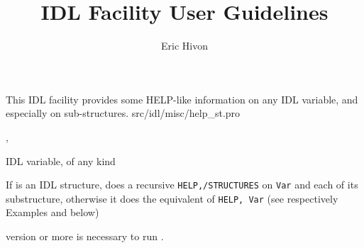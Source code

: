 

\sloppy

\title{\healpix IDL Facility User Guidelines}
 \section[help\_st]{ }
\label{idl:help_st}
\author{Eric Hivon}

\begin{facility}
{This IDL facility provides some HELP-like information on any IDL variable,
and especially on sub-structures.}
{src/idl/misc/help\_st.pro}
\end{facility}

\begin{IDLformat}
{\thedocid,
}
\end{IDLformat}

\begin{qualifiers}
  \begin{qulist}{} %
    \item[Var] %
	IDL variable, of any kind
  \end{qulist}
\end{qualifiers}


\begin{codedescription}
{%
If  is an IDL structure, \thedocid{} does a recursive \texttt{HELP,/STRUCTURES} on \texttt{Var} and each of its substructure, otherwise it does the equivalent of \texttt{HELP, Var} (see respectively 
Examples 
 and 
 below)}
\end{codedescription}



\begin{related}
  \begin{sulist}{} %
    \item[idl] version \idlversion or more is necessary to run \thedocid.
  \end{sulist}
\end{related}

